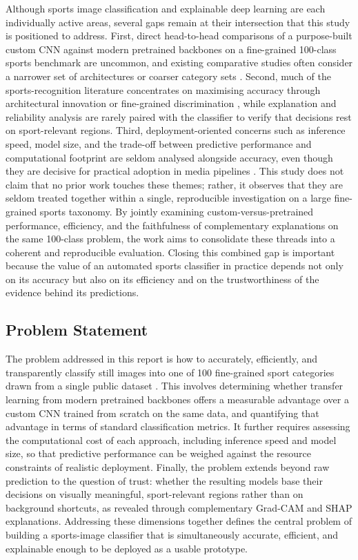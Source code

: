 Although sports image classification and explainable deep learning are each individually active areas, several gaps remain at their intersection that this study is positioned to address.
First, direct head-to-head comparisons of a purpose-built custom CNN against modern pretrained backbones on a fine-grained 100-class sports benchmark are uncommon, and existing comparative studies often consider a narrower set of architectures or coarser category sets \citep{liu2024comparison}.
Second, much of the sports-recognition literature concentrates on maximising accuracy through architectural innovation or fine-grained discrimination \citep{bera2023finegrained}, while explanation and reliability analysis are rarely paired with the classifier to verify that decisions rest on sport-relevant regions.
Third, deployment-oriented concerns such as inference speed, model size, and the trade-off between predictive performance and computational footprint are seldom analysed alongside accuracy, even though they are decisive for practical adoption in media pipelines \citep{ray2025womensports}.
This study does not claim that no prior work touches these themes; rather, it observes that they are seldom treated together within a single, reproducible investigation on a large fine-grained sports taxonomy.
By jointly examining custom-versus-pretrained performance, efficiency, and the faithfulness of complementary explanations on the same 100-class problem, the work aims to consolidate these threads into a coherent and reproducible evaluation.
Closing this combined gap is important because the value of an automated sports classifier in practice depends not only on its accuracy but also on its efficiency and on the trustworthiness of the evidence behind its predictions.

\subsection{Problem Statement}
\label{sec:intro-problem}

The problem addressed in this report is how to accurately, efficiently, and transparently classify still images into one of 100 fine-grained sport categories drawn from a single public dataset \citep{piosenka2022sports}.
This involves determining whether transfer learning from modern pretrained backbones offers a measurable advantage over a custom CNN trained from scratch on the same data, and quantifying that advantage in terms of standard classification metrics.
It further requires assessing the computational cost of each approach, including inference speed and model size, so that predictive performance can be weighed against the resource constraints of realistic deployment.
Finally, the problem extends beyond raw prediction to the question of trust: whether the resulting models base their decisions on visually meaningful, sport-relevant regions rather than on background shortcuts, as revealed through complementary Grad-CAM and SHAP explanations.
Addressing these dimensions together defines the central problem of building a sports-image classifier that is simultaneously accurate, efficient, and explainable enough to be deployed as a usable prototype.

